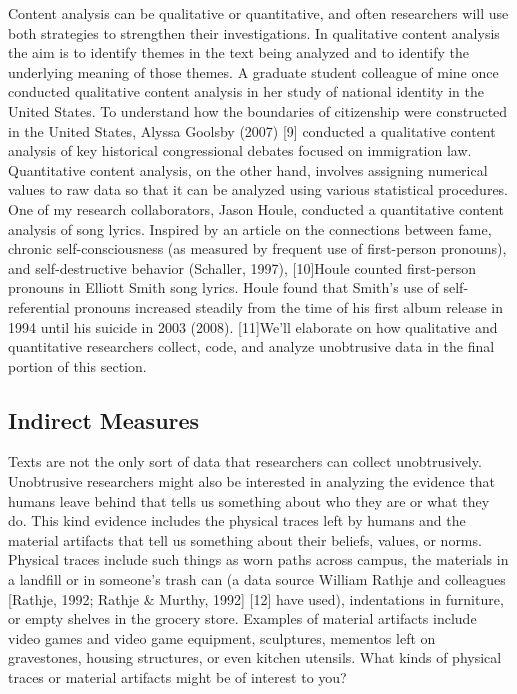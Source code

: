 Content analysis can be qualitative or quantitative, and often researchers will use both strategies to strengthen their investigations. In qualitative content analysis the aim is to identify themes in the text being analyzed and to identify the underlying meaning of those themes. A graduate student colleague of mine once conducted qualitative content analysis in her study of national identity in the United States. To understand how the boundaries of citizenship were constructed in the United States, Alyssa Goolsby (2007) [9] conducted a qualitative content analysis of key historical congressional debates focused on immigration law. Quantitative content analysis, on the other hand, involves assigning numerical values to raw data so that it can be analyzed using various statistical procedures. One of my research collaborators, Jason Houle, conducted a quantitative content analysis of song lyrics. Inspired by an article on the connections between fame, chronic self-consciousness (as measured by frequent use of first-person pronouns), and self-destructive behavior (Schaller, 1997), [10]Houle counted first-person pronouns in Elliott Smith song lyrics. Houle found that Smith’s use of self-referential pronouns increased steadily from the time of his first album release in 1994 until his suicide in 2003 (2008). [11]We’ll elaborate on how qualitative and quantitative researchers collect, code, and analyze unobtrusive data in the final portion of this section.

\subsection{Indirect Measures}

Texts are not the only sort of data that researchers can collect unobtrusively. Unobtrusive researchers might also be interested in analyzing the evidence that humans leave behind that tells us something about who they are or what they do. This kind evidence includes the physical traces left by humans and the material artifacts that tell us something about their beliefs, values, or norms. Physical traces include such things as worn paths across campus, the materials in a landfill or in someone’s trash can (a data source William Rathje and colleagues [Rathje, 1992; Rathje \& Murthy, 1992] [12] have used), indentations in furniture, or empty shelves in the grocery store. Examples of material artifacts include video games and video game equipment, sculptures, mementos left on gravestones, housing structures, or even kitchen utensils. What kinds of physical traces or material artifacts might be of interest to you?

